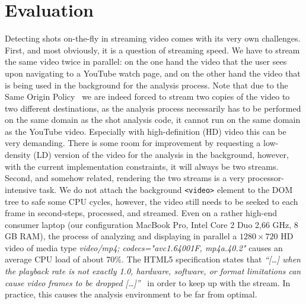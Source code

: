 \documentclass{acm_proc_article-sp}
\begin{document}

\section{Evaluation} \label{sec:evaluation}
Detecting shots on-the-fly in streaming video comes with its very own challenges. First, and most obviously, it is a question of streaming speed. We have to stream the same video twice in parallel: on the one hand the video that the user sees upon navigating to a YouTube watch page, and on the other hand the video that is being used in the background for the analysis process. Note that due to the Same Origin Policy~\cite{sameoriginpolicy} we are indeed forced to stream two copies of the video to two different destinations, as the analysis process necessarily has to be performed on the same domain as the shot analysis code, it cannot run on the same domain as the YouTube video. Especially with high-definition (HD) video this can be very demanding. There is some room for improvement by requesting a low-density (LD) version of the video for the analysis in the background, however, with the current implementation constraints, it will always be two streams. Second, and somehow related, rendering the two streams is a very processor-intensive task. We do not attach the background \texttt{<video>} element to the DOM tree to safe some CPU cycles, however, the video still needs to be seeked to each frame in second-steps, processed, and streamed. Even on a rather high-end consumer laptop (our configuration MacBook Pro, Intel Core 2 Duo 2,66 GHz, 8 GB RAM), the process of analyzing and displaying in parallel a $1280 \times 720$ HD video of media type \emph{video/mp4; codecs="avc1.64001F, mp4a.40.2"} causes an average CPU load of about 70\%. The HTML5 specification states that \textit{``[\ldots] when the playback rate is not exactly 1.0, hardware, software, or format limitations can cause video frames to be dropped [\ldots]''}~\cite{whatwgvideo} in order to keep up with the stream. In practice, this causes the analysis environment to be far from optimal.
\end{document}

